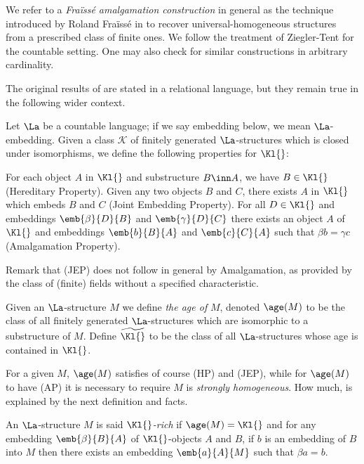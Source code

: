 We refer to a {\em Fra\"iss\'e amalgamation construction} in general as the technique introduced by Roland Fra\"iss\'e in \cite{fra}
to recover universal-homogeneous structures from a prescribed class of finite ones. We follow the treatment
of Ziegler-Tent \cite{zietent} for the countable setting. One may also check \cite{bs} for similar constructions in arbitrary cardinality.

The original results of \cite{fra} are stated in a relational language, but they remain true in the following wider context.

\medskip
Let $\La$ be a countable language; if we say embedding below, we mean $\La$-embedding.
Given a class $\mathcal{K}$ of finitely generated $\La$-structures which is closed under isomorphisms,
we define the following properties for $\Kl{}$:
\begin{itemize}
 For each object $A$ in $\Kl{}$ and substructure $B\inn A$, we have $B\in\Kl{}$ (Hereditary Property).
 Given any two objects $B$ and $C$, there exists
$A$ in $\Kl{}$ which embeds $B$ and $C$ (Joint Embedding Property).
 For all $D\in\Kl{}$ and embeddings $\emb{\beta}{D}{B}$ and
$\emb{\gamma}{D}{C}$ there exists an object $A$ of $\Kl{}$ and embeddings $\emb{b}{B}{A}$ and $\emb{c}{C}{A}$
such that $\beta b=\gamma c$ (Amalgamation Property).
\end{itemize}
Remark that (JEP) does not follow in general by Amalgamation, as provided by the class of (finite) fields without a
specified characteristic.

Given an $\La$-structure $M$ we define {\em the age of} %
$M$, denoted $\age(M)$ to be the class of all finitely generated $\La$-structures which are isomorphic to a substructure of $M$.
Define $\widetilde{\Kl{}}$ to be the class of all $\La$-structures whose age is contained in $\Kl{}$.

For a given $M$, $\age(M)$ satisfies of course (HP) and (JEP), while for $\age(M)$ to have (AP)
it is necessary to require $M$ is {\em strongly homogeneous}. How much, is explained by the next definition and facts.
\begin{dfn}\label{ricca}
An $\La$-structure $M$ is said {\em $\Kl{}$-rich}
if $\age(M)=\Kl{}$ and 
for any embedding $\emb{\beta}{B}{A}$ of $\Kl{}$-objects $A$ and $B$, if $b$ is an embedding of
$B$ into $M$ then there exists an embedding $\emb{a}{A}{M}$ such that $\beta a=b$.
\end{dfn}


